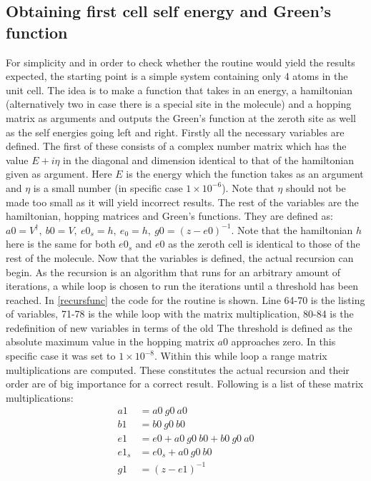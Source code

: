 \subsection{Obtaining first cell self energy and Green's function}\label{recursionroutinesec}
For simplicity and in order to check whether the routine would yield the results expected, the starting point is a simple system containing only 4 atoms in the unit cell. The idea is to make a function that takes in an energy, a hamiltonian (alternatively two in case there is a special site in the molecule) and a hopping matrix as arguments and outputs the Green's function at the zeroth site as well as the self energies going left and right. Firstly all the necessary variables are defined. The first of these consists of a complex number matrix which has the value \(E + i\eta\) in the diagonal and dimension identical to that of the hamiltonian given as argument. Here \(E\) is the energy which the function takes as an argument and \(\eta\) is a small number (in specific case \(1\times10^{-6}\)). Note that \(\eta\) should not be made too small as it will yield incorrect results. The rest of the variables are the hamiltonian, hopping matrices and Green's functions. They are defined as: \(a0 = V^{\dagger}, \ b0 = V, \ e0_{s} = h, \ e_{0} = h, \ g0 = (z-e0)^{-1}\). Note that the hamiltonian \(h\) here is the same for both \(e0_{s}\) and \(e0\) as the zeroth cell is identical to those of the rest of the molecule. Now that the variables is defined, the actual recursion can begin. As the recursion is an algorithm that runs for an arbitrary amount of iterations, a while loop is chosen to run the iterations until a threshold has been reached. In \cref{recursfunc} the code for the routine is shown. Line 64-70 is the listing of variables, 71-78 is the while loop with the matrix multiplication, 80-84 is the redefinition of new variables in terms of the old The threshold is defined as the absolute maximum value in the hopping matrix \(a0\) approaches zero. In this specific case it was set to \(1\times10^{-8} \). Within this while loop a range matrix multiplications are computed. These constitutes the actual recursion and their order are of big importance for a correct result. Following is a list of these matrix multiplications: 
\begin{align*}
a1 &= a0\ g0\ a0\\
b1 &= b0\ g0\ b0\\
e1 &= e0 + a0\ g0\ b0 + b0\ g0\ a0 \\
e1_{s} &= e0_{s} + a0\ g0\ b0 \\
g1 &= (z - e1)^{-1}
\end{align*}
